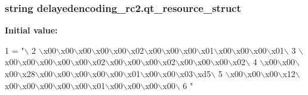 \subsubsection[{qt\+\_\+resource\+\_\+struct}]{\setlength{\rightskip}{0pt plus 5cm}string delayedencoding\+\_\+rc2.\+qt\+\_\+resource\+\_\+struct}\label{namespacedelayedencoding__rc2_aa14f7bc522563bee402d5e21fb75dbe6}
{\bfseries Initial value\+:}
\begin{DoxyCode}
1 = \textcolor{stringliteral}{"\(\backslash\)}
2 \textcolor{stringliteral}{\(\backslash\)x00\(\backslash\)x00\(\backslash\)x00\(\backslash\)x00\(\backslash\)x00\(\backslash\)x02\(\backslash\)x00\(\backslash\)x00\(\backslash\)x00\(\backslash\)x01\(\backslash\)x00\(\backslash\)x00\(\backslash\)x00\(\backslash\)x01\(\backslash\)}
3 \textcolor{stringliteral}{\(\backslash\)x00\(\backslash\)x00\(\backslash\)x00\(\backslash\)x00\(\backslash\)x00\(\backslash\)x02\(\backslash\)x00\(\backslash\)x00\(\backslash\)x00\(\backslash\)x02\(\backslash\)x00\(\backslash\)x00\(\backslash\)x00\(\backslash\)x02\(\backslash\)}
4 \textcolor{stringliteral}{\(\backslash\)x00\(\backslash\)x00\(\backslash\)x00\(\backslash\)x28\(\backslash\)x00\(\backslash\)x00\(\backslash\)x00\(\backslash\)x00\(\backslash\)x00\(\backslash\)x01\(\backslash\)x00\(\backslash\)x00\(\backslash\)x03\(\backslash\)xd5\(\backslash\)}
5 \textcolor{stringliteral}{\(\backslash\)x00\(\backslash\)x00\(\backslash\)x00\(\backslash\)x12\(\backslash\)x00\(\backslash\)x00\(\backslash\)x00\(\backslash\)x00\(\backslash\)x00\(\backslash\)x01\(\backslash\)x00\(\backslash\)x00\(\backslash\)x00\(\backslash\)x00\(\backslash\)}
6 \textcolor{stringliteral}{"}
\end{DoxyCode}

